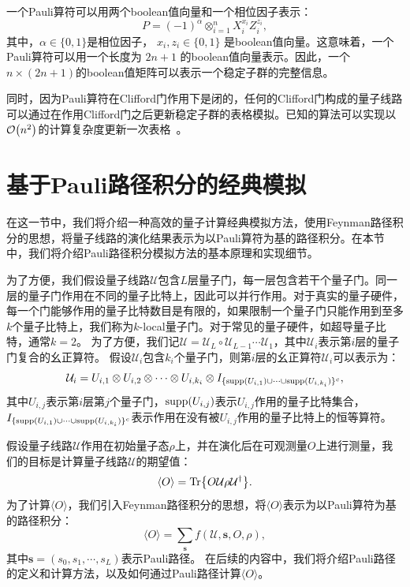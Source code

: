 一个Pauli算符可以用两个boolean值向量和一个相位因子表示：
\begin{equation}
    P = (-1)^\alpha \otimes_{i=1}^n X_i^{x_i} Z_i^{z_i},
\end{equation}
其中，$\alpha\in\{0,1\}$是相位因子，  $x_i, z_i\in\{0,1\}$  是boolean值向量。这意味着，一个Pauli算符可以用一个长度为  $2n+1$  的boolean值向量表示。因此，一个$n\times (2n+1)$的boolean值矩阵可以表示一个稳定子群的完整信息。

同时，因为Pauli算符在Clifford门作用下是闭的，任何的Clifford门构成的量子线路可以通过在作用Clifford门之后更新稳定子群的表格模拟。已知的算法可以实现以$\order{n^2}$的计算复杂度更新一次表格~\cite{PhysRevA.70.052328}。

\section{基于Pauli路径积分的经典模拟}
在这一节中，我们将介绍一种高效的量子计算经典模拟方法，使用Feynman路径积分的思想，将量子线路的演化结果表示为以Pauli算符为基的路径积分。在本节中，我们将介绍Pauli路径积分模拟方法的基本原理和实现细节。

为了方便，我们假设量子线路$\mathcal{U}$包含$L$层量子门，每一层包含若干个量子门。同一层的量子门作用在不同的量子比特上，因此可以并行作用。对于真实的量子硬件，每一个门能够作用的量子比特数目是有限的，如果限制一个量子门只能作用到至多$k$个量子比特上，我们称为$k$-local量子门。对于常见的量子硬件，如超导量子比特，通常$k=2$。
为了方便，我们记$\mathcal{U} = \mathcal{U}_L\circ \mathcal{U}_{L-1} \cdots \mathcal{U}_1$，其中$\mathcal{U}_i$表示第$i$层的量子门复合的幺正算符。
假设$\mathcal{U}_i$包含$k_i$个量子门，则第$i$层的幺正算符$\mathcal{U}_i$可以表示为：
\begin{equation}
    \mathcal{U}_i = U_{i,1} \otimes U_{i,2} \otimes \cdots \otimes U_{i,k_i}\otimes I_{\{\text{supp}(U_{i,1})\cup \cdots \cup \text{supp}(U_{i,k_i})\}^c},
\end{equation}
其中$U_{i,j}$表示第$i$层第$j$个量子门，$\text{supp}(U_{i,j})$表示$U_{i,j}$作用的量子比特集合，$I_{\{\text{supp}(U_{i,1})\cup \cdots \cup \text{supp}(U_{i,k_i})\}^c}$表示作用在没有被$U_{i,j}$作用的量子比特上的恒等算符。

假设量子线路$\mathcal{U}$作用在初始量子态$\rho$上，并在演化后在可观测量$O$上进行测量，我们的目标是计算量子线路$\mathcal{U}$的期望值：
\begin{equation}
    \langle O \rangle = \Tr{O \mathcal{U} \rho \mathcal{U}^\dagger}.
\end{equation}
为了计算$\langle O \rangle$，我们引入Feynman路径积分的思想，将$\langle O \rangle$表示为以Pauli算符为基的路径积分：
\begin{equation}
    \langle O \rangle = \sum_{\bm{s}} f(\mathcal{U},\bm{s},O,\rho),
\end{equation}
其中$\bm{s} = (s_0, s_1, \cdots, s_L)$表示Pauli路径。
在后续的内容中，我们将介绍Pauli路径的定义和计算方法，以及如何通过Pauli路径计算$\langle O \rangle$。

